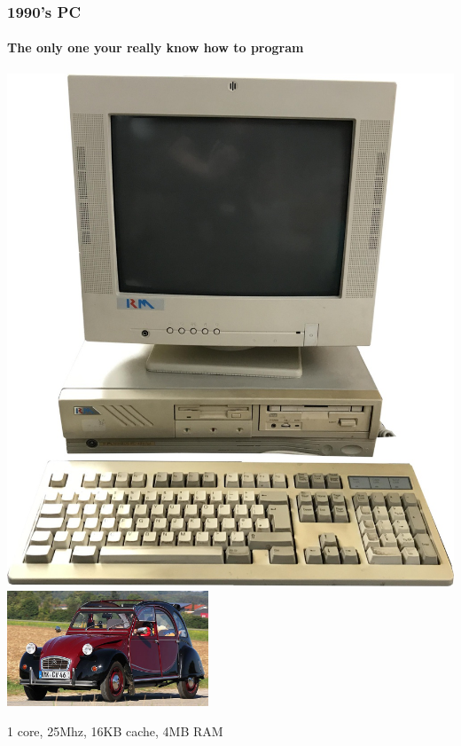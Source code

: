 \documentclass[xcolor={x11names,svgnames,psnames}]{beamer}
\begin{document}
\begin{frame}
  \frametitle{1990's PC}
  \framesubtitle{The only one your really know how to program}
  
  \centering
  \includegraphics[height=0.5\textheight]{old_pc}
  \hfill
  \includegraphics[width=6cm]{2cv}

  \bigskip

  1 core, 25Mhz, 16KB cache, 4MB RAM
\end{frame}

\end{document}
